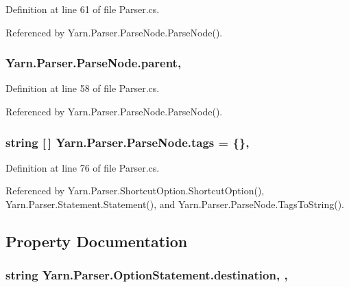 Definition at line 61 of file Parser.\-cs.



Referenced by Yarn.\-Parser.\-Parse\-Node.\-Parse\-Node().

\hypertarget{a00142_af313a82103fcc2ff5a177dbb06b92f7b}{
\subsubsection[{parent}]{ Yarn.\-Parser.\-Parse\-Node.\-parent\hspace{0.3cm}{\ttfamily [package]}, {\ttfamily [inherited]}}}\label{a00142_af313a82103fcc2ff5a177dbb06b92f7b}


Definition at line 58 of file Parser.\-cs.



Referenced by Yarn.\-Parser.\-Parse\-Node.\-Parse\-Node().

\hypertarget{a00142_a58b3a15788fd2d4127d73619dc6d04ae}{
\subsubsection[{tags}]{\setlength{\rightskip}{0pt plus 5cm}string \mbox{[}$\,$\mbox{]} Yarn.\-Parser.\-Parse\-Node.\-tags = \{\}\hspace{0.3cm}{\ttfamily [package]}, {\ttfamily [inherited]}}}\label{a00142_a58b3a15788fd2d4127d73619dc6d04ae}


Definition at line 76 of file Parser.\-cs.



Referenced by Yarn.\-Parser.\-Shortcut\-Option.\-Shortcut\-Option(), Yarn.\-Parser.\-Statement.\-Statement(), and Yarn.\-Parser.\-Parse\-Node.\-Tags\-To\-String().



\subsection{Property Documentation}
\hypertarget{a00140_abbe56fba06169901508e6c659f06c236}{
\subsubsection[{destination}]{\setlength{\rightskip}{0pt plus 5cm}string Yarn.\-Parser.\-Option\-Statement.\-destination\hspace{0.3cm}{\ttfamily [get]}, {\ttfamily [set]}, {\ttfamily [package]}}}\label{a00140_abbe56fba06169901508e6c659f06c236}


